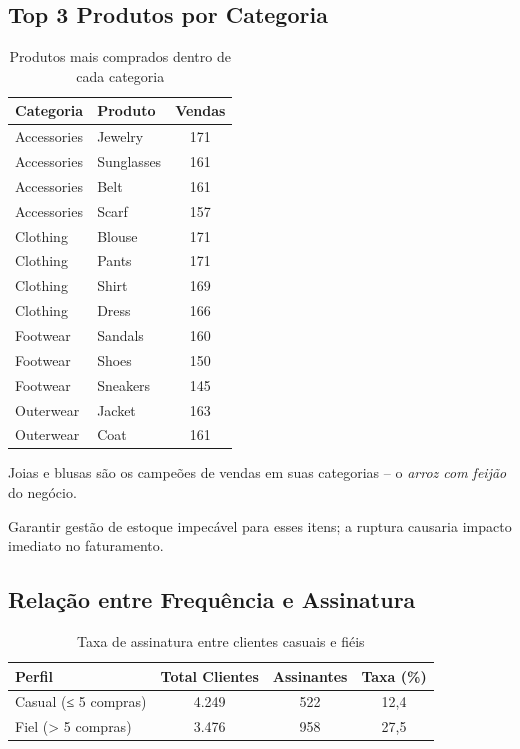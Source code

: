 \documentclass[12pt,a4paper]{article}
\begin{document}
\subsection{Top 3 Produtos por Categoria}
\begin{table}[H]
\centering
\caption{Produtos mais comprados dentro de cada categoria}
\label{tab:top_categoria}
\begin{tabular}{llc}
\toprule
\rowcolor{lightgray} \textbf{Categoria} & \textbf{Produto} & \textbf{Vendas} \\
\midrule
Accessories & Jewelry     & 171 \\
Accessories & Sunglasses  & 161 \\
Accessories & Belt        & 161 \\
Accessories & Scarf       & 157 \\
Clothing    & Blouse      & 171 \\
Clothing    & Pants       & 171 \\
Clothing    & Shirt       & 169 \\
Clothing    & Dress       & 166 \\
Footwear    & Sandals     & 160 \\
Footwear    & Shoes       & 150 \\
Footwear    & Sneakers    & 145 \\
Outerwear   & Jacket      & 163 \\
Outerwear   & Coat        & 161 \\
\bottomrule
\end{tabular}
\end{table}

\begin{insightbox}
Joias e blusas são os campeões de vendas em suas categorias – o \textit{arroz com feijão} do negócio.
\end{insightbox}
\begin{actionbox}
Garantir gestão de estoque impecável para esses itens; a ruptura causaria impacto imediato no faturamento.
\end{actionbox}

\subsection{Relação entre Frequência e Assinatura}
\begin{table}[H]
\centering
\caption{Taxa de assinatura entre clientes casuais e fiéis}
\label{tab:assinatura_fidelidade}
\begin{tabular}{lccc}
\toprule
\rowcolor{lightgray} \textbf{Perfil} & \textbf{Total Clientes} & \textbf{Assinantes} & \textbf{Taxa (\%)} \\
\midrule
Casual (≤ 5 compras) & 4.249 & 522 & 12,4 \\
Fiel (> 5 compras)   & 3.476 & 958 & 27,5 \\
\bottomrule
\end{tabular}
\end{table}
\end{document}
